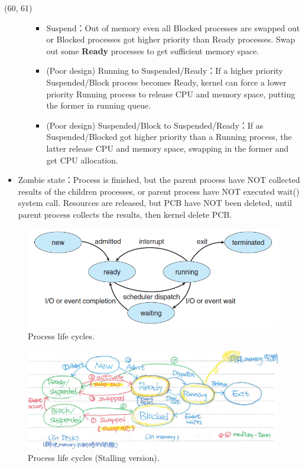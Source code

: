 \begin{theorem}{(60, 61)}
\begin{itemize}
\begin{itemize}
\begin{itemize}
                \item Suspend：Out of memory even all Blocked processes are swapped out or Blocked processes got higher priority than Ready processes. Swap out some \textbf{Ready} processes to get sufficient memory space.
                \item (Poor design) Running to Suspended/Ready：If a higher priority Suspended/Block process becomes Ready, kernel can force a lower priority Running process to release CPU and memory space, putting the former in running queue.
                \item (Poor design) Suspended/Block to Suspended/Ready：If as Suspended/Blocked got higher priority than a Running process, the latter release CPU and memory space, swapping in the former and get CPU allocation.
            \end{itemize}
        \end{itemize}
        \item Zombie state：Process is finished, but the parent process have NOT collected results of the children processes, or parent process have NOT executed wait() system call. Resources are released, but PCB have NOT been deleted, until parent process collects the results, then kernel delete PCB.
    \end{itemize}
\end{theorem}

\begin{figure}[H]
    \centering
    \includegraphics[scale=0.8]{img/process_lifecycles.png}
    \caption{Process life cycles.}
    \label{img:process_lifecycles}
\end{figure}

\begin{figure}[H]
    \centering
    \includegraphics[scale=0.75]{img/process_lifecycles_stalling.png}
    \caption{Process life cycles (Stalling version).}
    \label{img:process_lifecycles_stalling}
\end{figure}

